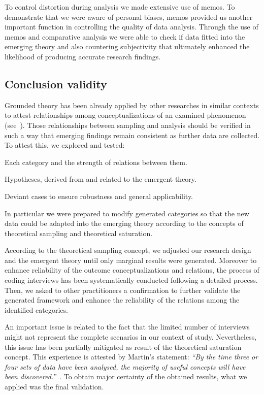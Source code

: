 \documentclass[10pt,journal,letterpaper,compsoc]{IEEEtran}
\begin{document}
To control distortion during analysis we made extensive use of memos. To
demonstrate that we were aware of personal biases, memos provided us another
important function in controlling the quality of data analysis. Through the use
of memos and comparative analysis we were able to check if data fitted into the
emerging theory and also countering subjectivity that ultimately enhanced the
likelihood of producing accurate research findings.

\subsection{Conclusion validity}

Grounded theory has been already applied by other researches in similar
contexts to attest relationships among conceptualizations of an examined
phenomenon (see~\cite{Coleman2007, Basri, Coleman2008a}). Those relationships
between sampling and analysis should be verified in such a way that emerging
findings remain consistent as further data are collected. To attest this, we
explored and tested:

\begin{compactitem} 
  \item Each category and the strength of relations between them. 
  \item Hypotheses, derived from and related to the emergent theory. 
  \item Deviant cases to ensure robustness and general applicability. 
\end{compactitem}

In particular we were prepared to modify generated categories so that the new
data could be adapted into the emerging theory according to the concepts of
theoretical sampling and theoretical saturation.

According to the theoretical sampling concept, we adjusted our research design
and the emergent theory until only marginal results were generated. Moreover to
enhance reliability of the outcome conceptualizations and relations, the
process of coding interviews has been systematically conducted following a
detailed process. Then, we asked to other practitioners a confirmation to
further validate the generated framework and enhance the reliability of the
relations among the identified categories.

An important issue is related to the fact that the limited number of interviews
might not represent the complete scenarios in our context of study.
Nevertheless, this issue has been partially mitigated as result of the
theoretical saturation concept. This experience is attested by Martin's
statement: \textit{``By the time three or four sets of data have been analysed,
the majority of useful concepts will have been 
discovered.''}~\cite{giardinoEtAl}. To obtain major certainty of the obtained 
results, what we applied was the final validation.
\end{document}
